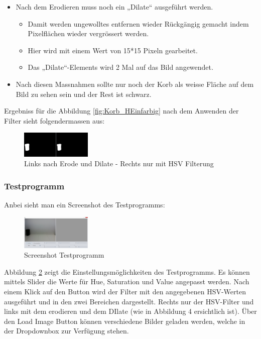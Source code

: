\begin{itemize}
\begin{itemize}
		\item So werden kleine ungewollte weisse Pixel aus dem Bild entfernt.
		\item Dieser Vorgang wird 2 Mal auf das Bild angewendet.
	\end{itemize}
	\item Nach dem Erodieren muss noch ein „Dilate“ ausgeführt werden.
	\begin{itemize}
		\item Damit werden ungewolltes entfernen wieder Rückgängig gemacht indem Pixelflächen wieder vergrössert werden.
		\item Hier wird mit einem Wert von 15*15 Pixeln gearbeitet.
		\item Das „Dilate“-Elements wird 2 Mal auf das Bild angewendet.
	\end{itemize}
	\item Nach diesen Massnahmen sollte nur noch der Korb als weisse Fläche auf dem Bild zu sehen sein und der Rest ist schwarz.
\end{itemize}

Ergebniss für die Abbildung \ref{fig:Korb_HEinfarbig} nach dem Anwenden der Filter sieht folgendermassen aus:

\begin{figure}[h!]
	\centering
	\includegraphics[width=0.3\textwidth]{fig/Korberkennung1.png}
	\caption{Links nach Erode und Dilate - Rechts nur mit HSV Filterung}
	\label{fig:Korb_Erkennung}
\end{figure}

\subsubsection{Testprogramm}
Anbei sieht man ein Screenshot des Testprogramms:
\begin{figure}[h!]
	\centering
	\includegraphics[width=0.3\textwidth]{fig/Testprogramm.png}
	\caption{Screenshot Testprogramm}
	\label{fig:Korb_Testprogramm}
\end{figure}

Abbildung \ref{fig:Korb_Testprogramm} zeigt die Einstellungsmöglichkeiten des Testprogramms. Es können mittels Slider die Werte für Hue, Saturation und Value angepasst werden. Nach einem Klick auf den Button wird der Filter mit den angegebenen HSV-Werten ausgeführt und in den zwei Bereichen dargestellt. Rechts nur der HSV-Filter und links mit dem erodieren und dem DIlate (wie in Abbildung 4 ersichtlich ist).
Über den Load Image Button können verschiedene Bilder geladen werden, welche in der Dropdownbox zur Verfügung stehen.

